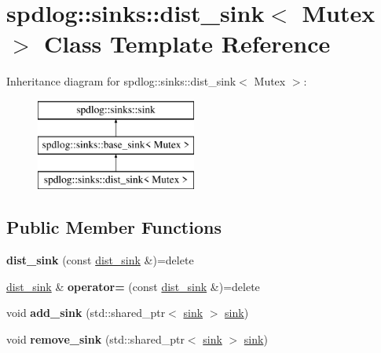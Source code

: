 \hypertarget{classspdlog_1_1sinks_1_1dist__sink}{}\section{spdlog\+:\+:sinks\+:\+:dist\+\_\+sink$<$ Mutex $>$ Class Template Reference}
\label{classspdlog_1_1sinks_1_1dist__sink}
Inheritance diagram for spdlog\+:\+:sinks\+:\+:dist\+\_\+sink$<$ Mutex $>$\+:\begin{figure}[H]
\begin{center}
\leavevmode
\includegraphics[height=3.000000cm]{classspdlog_1_1sinks_1_1dist__sink}
\end{center}
\end{figure}
\subsection*{Public Member Functions}
\begin{DoxyCompactItemize}
\item 
{\bfseries dist\+\_\+sink} (const \hyperlink{classspdlog_1_1sinks_1_1dist__sink}{dist\+\_\+sink} \&)=delete\hypertarget{classspdlog_1_1sinks_1_1dist__sink_afadef20aeb435c8b62b2efa2f0906de5}{}\label{classspdlog_1_1sinks_1_1dist__sink_afadef20aeb435c8b62b2efa2f0906de5}

\item 
\hyperlink{classspdlog_1_1sinks_1_1dist__sink}{dist\+\_\+sink} \& {\bfseries operator=} (const \hyperlink{classspdlog_1_1sinks_1_1dist__sink}{dist\+\_\+sink} \&)=delete\hypertarget{classspdlog_1_1sinks_1_1dist__sink_a6f91b5522c12fd448ca2fd7cb8fe0097}{}\label{classspdlog_1_1sinks_1_1dist__sink_a6f91b5522c12fd448ca2fd7cb8fe0097}

\item 
void {\bfseries add\+\_\+sink} (std\+::shared\+\_\+ptr$<$ \hyperlink{classspdlog_1_1sinks_1_1sink}{sink} $>$ \hyperlink{classspdlog_1_1sinks_1_1sink}{sink})\hypertarget{classspdlog_1_1sinks_1_1dist__sink_ae2250f59f23ecaf3214da6059198ad3c}{}\label{classspdlog_1_1sinks_1_1dist__sink_ae2250f59f23ecaf3214da6059198ad3c}

\item 
void {\bfseries remove\+\_\+sink} (std\+::shared\+\_\+ptr$<$ \hyperlink{classspdlog_1_1sinks_1_1sink}{sink} $>$ \hyperlink{classspdlog_1_1sinks_1_1sink}{sink})\hypertarget{classspdlog_1_1sinks_1_1dist__sink_ac1537fdc6225fd57cc819e1fb9c5f8c7}{}\label{classspdlog_1_1sinks_1_1dist__sink_ac1537fdc6225fd57cc819e1fb9c5f8c7}

\end{DoxyCompactItemize}
